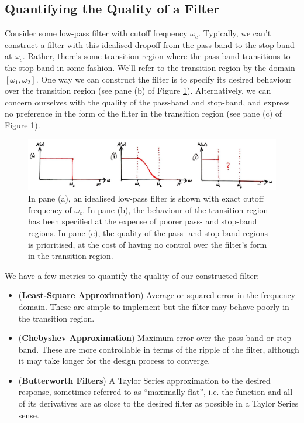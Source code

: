 \subsection{Quantifying the Quality of a Filter}
%
Consider some low-pass filter with cutoff frequency $\omega_c$. Typically,
we can't construct a filter with this idealised dropoff from the pass-band
to the stop-band at $\omega_c$. Rather, there's some transition region where
the pass-band transitions to the stop-band in some fashion. We'll refer to
the transition region by the domain $[\omega_1,\omega_2]$. One way we can
construct the filter is to specify its desired behaviour over the transition
region (see pane (b) of Figure \ref{fig::lecture_16_filter_quality}).
Alternatively, we can concern ourselves with the
quality of the pass-band and stop-band, and express no preference in the
form of the filter in the transition region (see pane (c) of
Figure \ref{fig::lecture_16_filter_quality}).\\
%
\begin{figure}[!htb]
  \includegraphics[width=\textwidth]{images/lecture_16_filter_quality.JPG}
  \caption{In pane (a), an idealised low-pass filter is shown with
    exact cutoff frequency of $\omega_c$. In pane (b), the behaviour of
    the transition region has been specified at the expense of poorer
    pass- and stop-band regions. In pane (c), the quality of the
    pass- and stop-band regions is prioritised, at the cost of
    having no control over the filter's form in the transition region.
  }
  \label{fig::lecture_16_filter_quality}
\end{figure}
%
We have a few metrics to quantify the quality of our constructed filter:
%
\begin{itemize}
\item (\textbf{Least-Square Approximation}) Average or squared error in the
  frequency domain. These are simple to implement but the filter may behave
  poorly in the transition region.
\item (\textbf{Chebyshev Approximation}) Maximum error over the pass-band or
  stop-band. These are more controllable in terms of the ripple of the filter,
  although it may take longer for the design process to converge.
\item (\textbf{Butterworth Filters}) A Taylor Series approximation to the
  desired response, sometimes referred to as ``maximally flat'', i.e. the function
  and all of its derivatives are as close to the desired filter as possible
  in a Taylor Series sense.
\end{itemize}

